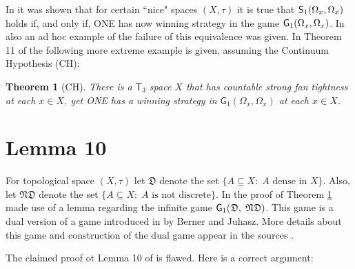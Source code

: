 \documentclass{amsart}
\newtheorem{theorem}{{\bf Theorem}}
\newcommand{\sone}{{\sf S}_1}
\newcommand{\gone}{{\sf G}_1}
\begin{document}
In \cite{COC3} it was shown that for certain ``nice" spaces $(X,\tau)$ it is true that $\sone(\Omega_x,\Omega_x)$ holds if, and only if, ONE has now winning strategy in the game $\gone(\Omega_x,\Omega_x)$. In \cite{COC3} also an ad hoc example of the failure of this equivalence was given. In Theorem 11 of \cite{RCT} the following more extreme example is given, assuming the Continuum Hypothesis (CH):
\begin{theorem}[CH]\label{oneextreme}
There is a $\textsf{T}_3$ space $X$ that has countable strong fan tightness at each $x\in X$, yet ONE has a winning strategy in $\textsf{G}_1(\Omega_x,\Omega_x)$ at each $x\in X$.
\end{theorem}

\section{Lemma 10}

For topological space $(X,\tau)$ let $\mathfrak{D}$ denote the set $\{A\subseteq X:\; A \mbox{ dense in }X\}$. Also, let $\mathfrak{ND}$ denote the set $\{A\subseteq X:\; A \mbox{ is not discrete}\}$.  In \cite{RCT} the proof of Theorem \ref{oneextreme} made use of a lemma regarding the infinite game $\gone(\mathfrak{D},\; \mathfrak{ND})$. This game is a dual version of a game introduced in \cite{BJ} by Berner and Juhasz. More details about this game and construction of the dual game appear in the sources \cite{BJ,  COC6, RCT}.

The claimed proof ot Lemma 10 of \cite{RCT} is flawed. Here is a correct argument:
\end{document}
